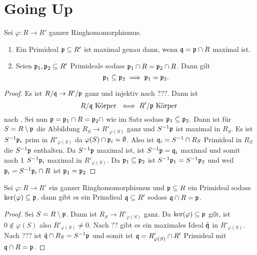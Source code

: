 \section{Going Up}
\begin{Satz} Sei \( \varphi \colon R \to R' \) ganzer Ringhomomorphismus.
	\begin{enumerate}
		\item Ein Primideal \( \mathfrak{p} \subseteq R' \) ist maximal genau dann, wenn \( \mathfrak{q}= \mathfrak{p} \cap R \) maximal ist.
		\item Seien \( \mathfrak{p}_1,\mathfrak{p}_2 \subseteq R' \) Primideale sodass \( \mathfrak{p}_1 \cap R = \mathfrak{p}_2 \cap R \). Dann gilt
		\[ \mathfrak{p}_1\subseteq \mathfrak{p}_2 \implies \mathfrak{p}_1 = \mathfrak{p}_2 . \]
	\end{enumerate}
	
\end{Satz}
\begin{proof}
	Es ist \( R / \mathfrak{q} \to R'/ \mathfrak{p} \) ganz und injektiv nach ???. Dann ist 
	\[ R / \mathfrak{q} \text{ Körper } \iff R'/ \mathfrak{p} \text{ Körper } \] nach .
	Sei nun \( \mathfrak{p} = \mathfrak{p}_1 \cap R = \mathfrak{p}_2 \cap \) wie im Satz sodass \( \mathfrak{p}_1 \subseteq \mathfrak{p}_2 \).
	Dann ist für \( S = R \setminus \mathfrak{p} \) die Abbildung \( R_S \to R'_{ \varphi ( S ) } \) ganz und \( S ^ { -1 } \mathfrak{p} \)
	ist maximal in \( R_S \). Es ist \( S ^ {-1} \mathfrak{p}_i \) prim in \( R'_{ \varphi ( S ) } \) da 
	\( \varphi ( S ) \cap \mathfrak{p}_i = \emptyset \).
	Also ist \( \mathfrak{q}_i = S^{-1} \cap R_S \) Primideal in \( R_S \) die \( S^{-1}\mathfrak{p} \) enthalten.
	Da \( S^{-1} \mathfrak{p} \) maximal ist, ist \( S ^ { -1 } \mathfrak{p} = \mathfrak{q}_i \) maximal und somit nach 1 \( S ^ { -1 } \mathfrak{p}_i \)
	maximal in \( R'_{ \varphi ( S ) } \).
	Da \( \mathfrak{p}_1 \subseteq \mathfrak{p}_2 \) ist \( S ^ { -1 } \mathfrak{p}_1 = S ^ { -1 } \mathfrak{p}_2 \) und weil 
	\( \mathfrak{p}_i = S ^ { -1 }\mathfrak{p}_i \cap R \) ist \( \mathfrak{p}_1 = \mathfrak{p}_2  \)
\end{proof}
\begin{Satz} \label{Satz:LivingOver}
	Sei \( \varphi \colon R \to R' \) ein ganzer Ringhomomorphismus und \( \mathfrak{p}\subseteq R \) ein Primideal sodass
	\(\ker(\varphi)\subseteq \mathfrak{p} \).
	dann gibt es ein Primdieal \(\mathfrak{q} \subseteq R' \) sodass \( \mathfrak{q} \cap R = \mathfrak{p} \).
	
\end{Satz}
\begin{proof}
	Sei \( S = R\setminus \mathfrak{p} \). Dann ist \( R_S \to R'_{\varphi(S)}\) ganz.
	Da \( \ker(\varphi)\subseteq \mathfrak{p} \) gilt, ist \( 0 \not \in \varphi(S) \) also \( R'_{\varphi(S)}\neq 0\).
	Nach ?? gibt es ein maximales Ideal \( \bar{\mathfrak{q}} \) in \( R'_{\varphi(S)}\).
	Nach ??? ist \( \bar{\mathfrak{q}} \cap R_S = S^{-1}\mathfrak{p}\) und somit ist \( \mathfrak{q}= R'_{\varphi(S)}\cap R' \) Primideal mit 
	\( \mathfrak{q} \cap R =\frak p \).
\end{proof}

